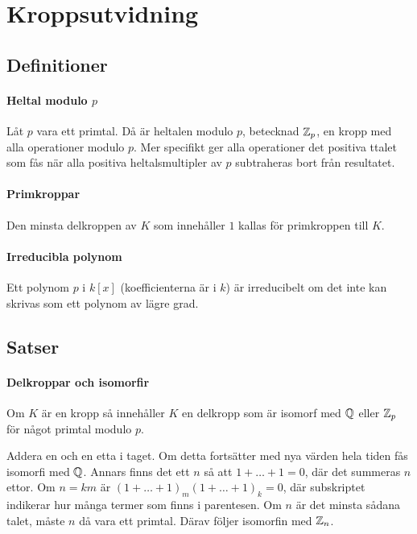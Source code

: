 \section{Kroppsutvidning}

\subsection{Definitioner}

\paragraph{Heltal modulo $p$}
Låt $p$ vara ett primtal. Då är heltalen modulo $p$, betecknad $\mathbb{Z}_{p}$, en kropp med alla operationer modulo $p$. Mer specifikt ger alla operationer det positiva ttalet som fås när alla positiva heltalsmultipler av $p$ subtraheras bort från resultatet.

\paragraph{Primkroppar}
Den minsta delkroppen av $K$ som innehåller $1$ kallas för primkroppen till $K$.

\paragraph{Irreducibla polynom}
Ett polynom $p$ i $k[x]$ (koefficienterna är i $k$) är irreducibelt om det inte kan skrivas som ett polynom av lägre grad.

\subsection{Satser}

\paragraph{Delkroppar och isomorfir}
Om $K$ är en kropp så innehåller $K$ en delkropp som är isomorf med $\mathbb{Q}$ eller $\mathbb{Z}_{p}$ för något primtal modulo $p$.

\proof
Addera en och en etta i taget. Om detta fortsätter med nya värden hela tiden fås isomorfi med $\mathbb{Q}$. Annars finns det ett $n$ så att $1 + \dots + 1 = 0$, där det summeras $n$ ettor. Om $n = km$ är $(1 + \dots + 1)_{m}(1 + \dots + 1)_{k} = 0$, där subskriptet indikerar hur många termer som finns i parentesen. Om $n$ är det minsta sådana talet, måste $n$ då vara ett primtal. Därav följer isomorfin med $\mathbb{Z}_{n}$.

